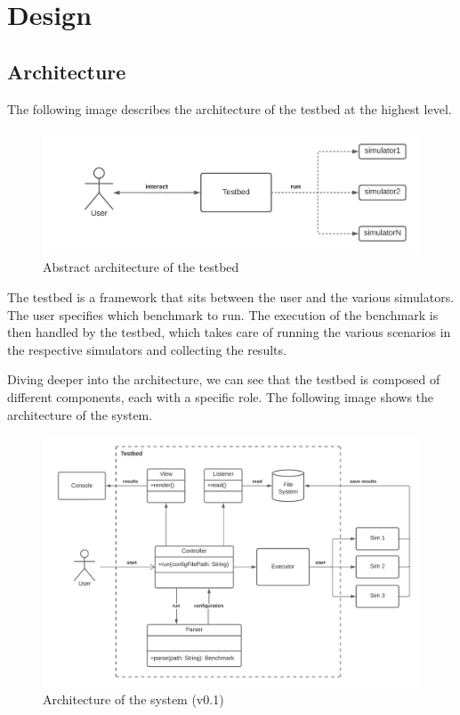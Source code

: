 \documentclass[12pt,a4paper,openright,twoside]{book}
\begin{document}
\chapter{Design}

\section{Architecture}

The following image describes the architecture of the testbed at the highest level.

\begin{figure}[H]
  \centering
  \includegraphics[width=\textwidth]{figures/architecture-high-level.png}
  \caption{Abstract architecture of the testbed}
\end{figure}

The testbed is a framework that sits between the user and the various simulators.
The user specifies which benchmark to run.
The execution of the benchmark is then handled by the testbed, which takes care of running the various scenarios in the respective simulators and collecting the results.

Diving deeper into the architecture, we can see that the testbed is composed of different components, each with a specific role.
The following image shows the architecture of the system.

\begin{figure}[h!]
  \centering
  \includegraphics[width=\textwidth]{figures/testbed-architecture.png}
  \caption{Architecture of the system (v0.1)}
  \label{fig:random-image}
\end{figure}
\end{document}
